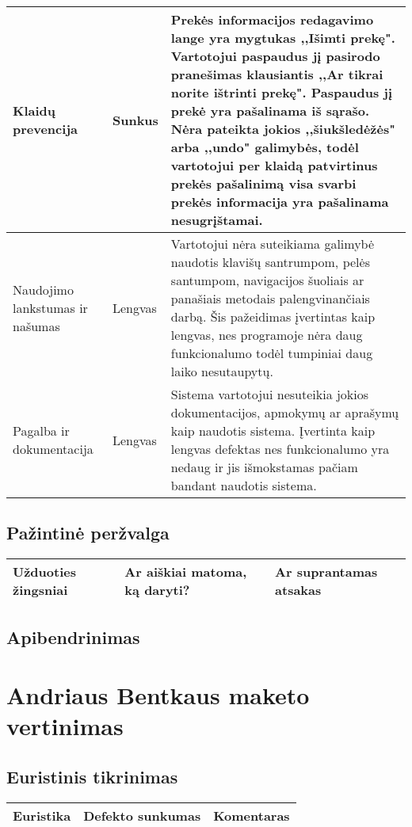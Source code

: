 \documentclass[oneside]{VUMIFPSkursinis}
\begin{document}
\begin{center}
    \begin{tabular}{ |p{3cm}| p{3cm} | p{11cm} | }
	\hline
	Klaidų prevencija & Sunkus & Prekės informacijos redagavimo lange yra mygtukas ,,Išimti prekę". 
					Vartotojui paspaudus jį pasirodo pranešimas klausiantis ,,Ar tikrai norite ištrinti prekę". 
					Paspaudus jį prekė yra pašalinama iš sąrašo.
					Nėra pateikta jokios ,,šiukšledėžės" arba ,,undo" galimybės, todėl vartotojui per klaidą patvirtinus prekės pašalinimą visa svarbi prekės informacija yra pašalinama nesugrįštamai. \\ \hline
	Naudojimo lankstumas ir našumas & Lengvas & Vartotojui nėra suteikiama galimybė naudotis klavišų santrumpom, pelės santumpom, navigacijos šuoliais ar panašiais metodais palengvinančiais darbą.
								Šis pažeidimas įvertintas kaip lengvas, nes programoje nėra daug funkcionalumo todėl tumpiniai daug laiko nesutaupytų. \\ \hline
	Pagalba ir dokumentacija & Lengvas & Sistema vartotojui nesuteikia jokios dokumentacijos, apmokymų ar aprašymų kaip naudotis sistema. 
							Įvertinta kaip lengvas defektas nes funkcionalumo yra nedaug ir jis išmokstamas pačiam bandant naudotis sistema. \\ \hline
   \hline
    \end{tabular}
\end{center}
	\subsection{Pažintinė peržvalga}

\begin{center}
    \begin{tabular}{ |p{4cm}| p{6cm} | p{7cm} | }
    \hline
    Užduoties žingsniai & Ar aiškiai matoma, ką daryti? & Ar suprantamas atsakas \\ \hline 
   \hline
    \end{tabular}
\end{center}
	\subsection{Apibendrinimas}
\section{Andriaus Bentkaus maketo vertinimas}
	\subsection{Euristinis tikrinimas}
\begin{center}
    \begin{tabular}{ |p{3cm}| p{3cm} | p{11cm} | }
    \hline
    Euristika &Defekto sunkumas &Komentaras \\ \hline 
   \hline
    \end{tabular}
\end{center}
\end{document}
